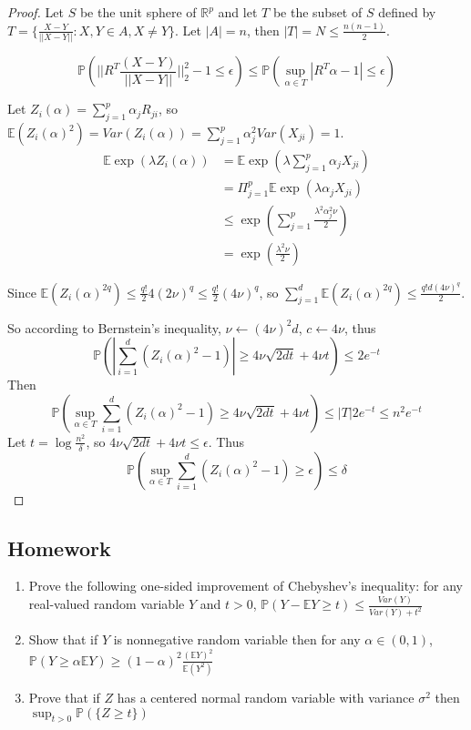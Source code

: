 \documentclass[11pt]{article}
\def\BP{{\bf P}}
\def\BR{{\mathbb R}}
\def\BE{{\mathbb E}}
\def\BP{{\mathbb P}}
\begin{document}
\begin{proof}
Let $S$ be the unit sphere of $\BR^p$ and let $T$ be the subset of $S$ defined by $T = \{ \frac{X- Y}{||X-Y||} : X, Y \in A, X \neq Y \}$. Let $|A| = n$, then $|T| = N \leq \frac{n(n-1)}{2}$.

\[
	\BP \left( ||R^T\frac{(X-Y)}{||X-Y||}||_2^2 - 1 \leq \epsilon \right) \leq \BP \left( \sup_{\alpha\in T} |R^T \alpha - 1| \leq \epsilon \right)
\]

Let $Z_i(\alpha) = \sum_{j=1}^{p} \alpha_j R_{ji}$, so $\BE (Z_i(\alpha)^2) = Var(Z_i(\alpha)) = \sum_{j=1}^p \alpha_j^2 Var(X_{ji}) = 1$.
\[\begin{split}
	\BE \exp(\lambda Z_i(\alpha)) &= \BE \exp(\lambda \sum_{j=1}^{p} \alpha_j X_{ji}) \\
 	& = \Pi_{j = 1}^p \BE \exp(\lambda \alpha_j X_{ji}) \\
	&\leq \exp(\sum_{j=1}^{p} \frac{\lambda^2 \alpha_j^2 \nu}{2}) \\
	&= \exp(\frac{\lambda^2 \nu}{2})
\end{split}\] 

Since $\BE (Z_i(\alpha)^{2q}) \leq \frac{q!}{2} 4(2\nu)^q \leq \frac{q!}{2}(4\nu)^q$, so
$\sum_{j=1}^{d} \BE (Z_i(\alpha)^{2q}) \leq \frac{q!d(4\nu)^q}{2}$.

So according to Bernstein's inequality, $\nu \leftarrow (4\nu)^2 d$, $c \leftarrow 4\nu$, thus
\[
	\BP( |\sum_{i=1}^{d}(Z_i(\alpha)^2 - 1) | \geq 4\nu\sqrt{2dt} + 4\nu t ) \leq 2e^{-t}
\]
Then
\[
	\BP\left( \sup_{\alpha \in T} \sum_{i=1}^{d} (Z_i(\alpha)^2 - 1) \geq 4\nu\sqrt{2dt } + 4\nu t \right) \leq |T|2e^{-t} \leq n^2 e^{-t}
\]
Let $t = \log \frac{n^2}{\delta} $, so
$4\nu\sqrt{2dt} + 4\nu t \leq \epsilon$. Thus
\[
	\BP\left( \sup_{\alpha \in T} \sum_{i=1}^{d} (Z_i(\alpha)^2 - 1) \geq \epsilon \right) \leq \delta
\]

\end{proof}



\subsection*{Homework}
\begin{enumerate}
\item Prove the following one-sided improvement of Chebyshev's inequality: for any real-valued random variable $Y$ and $t>0$, $\BP(Y - \BE Y\geq t) \leq \frac{Var(Y)}{Var(Y) + t^2}$
\item Show that if $Y$ is nonnegative random variable then for any $\alpha \in (0, 1)$, $\BP(Y \geq \alpha \BE Y) \geq (1-\alpha)^2 \frac{(\BE Y)^2}{\BE (Y^2)}$
\item Prove that if $Z$ has a centered normal random variable with variance $\sigma^2$ then $\sup_{t>0} \BP (\{ Z \geq t \})$
\end{enumerate}
\end{document}
